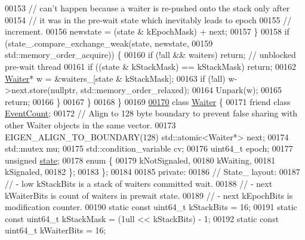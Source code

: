 \begin{DoxyCode}
{00153         \textcolor{comment}{// can't happen because a waiter is re-pushed onto the stack only after}
00154         \textcolor{comment}{// it was in the pre-wait state which inevitably leads to epoch}
00155         \textcolor{comment}{// increment.}
00156         newstate = (state & kEpochMask) + next;
00157       \}
00158       \textcolor{keywordflow}{if} (state\_.compare\_exchange\_weak(state, newstate,
00159                                        std::memory\_order\_acquire)) \{
00160         \textcolor{keywordflow}{if} (!all && waiters) \textcolor{keywordflow}{return};  \textcolor{comment}{// unblocked pre-wait thread}
00161         \textcolor{keywordflow}{if} ((state & kStackMask) == kStackMask) \textcolor{keywordflow}{return};
00162         \hyperlink{class_eigen_1_1_event_count_1_1_waiter}{Waiter}* w = &waiters\_[state & kStackMask];
00163         \textcolor{keywordflow}{if} (!all) w->next.store(\textcolor{keyword}{nullptr}, std::memory\_order\_relaxed);
00164         Unpark(w);
00165         \textcolor{keywordflow}{return};
00166       \}
00167     \}
00168   \}
00169 
\hyperlink{class_eigen_1_1_event_count_1_1_waiter}{00170}   \textcolor{keyword}{class }\hyperlink{class_eigen_1_1_event_count_1_1_waiter}{Waiter} \{
00171     \textcolor{keyword}{friend} \textcolor{keyword}{class }\hyperlink{class_eigen_1_1_event_count}{EventCount};
00172     \textcolor{comment}{// Align to 128 byte boundary to prevent false sharing with other Waiter objects in the same vector.}
00173     EIGEN\_ALIGN\_TO\_BOUNDARY(128) std::atomic<Waiter*> next;
00174     std::mutex mu;
00175     std::condition\_variable cv;
00176     uint64\_t epoch;
00177     \textcolor{keywordtype}{unsigned} \hyperlink{structstate}{state};
00178     \textcolor{keyword}{enum} \{
00179       kNotSignaled,
00180       kWaiting,
00181       kSignaled,
00182     \};
00183   \};
00184 
00185  \textcolor{keyword}{private}:
00186   \textcolor{comment}{// State\_ layout:}
00187   \textcolor{comment}{// - low kStackBits is a stack of waiters committed wait.}
00188   \textcolor{comment}{// - next kWaiterBits is count of waiters in prewait state.}
00189   \textcolor{comment}{// - next kEpochBits is modification counter.}
00190   \textcolor{keyword}{static} \textcolor{keyword}{const} uint64\_t kStackBits = 16;
00191   \textcolor{keyword}{static} \textcolor{keyword}{const} uint64\_t kStackMask = (1ull << kStackBits) - 1;
00192   \textcolor{keyword}{static} \textcolor{keyword}{const} uint64\_t kWaiterBits = 16;
}
\end{DoxyCode}
